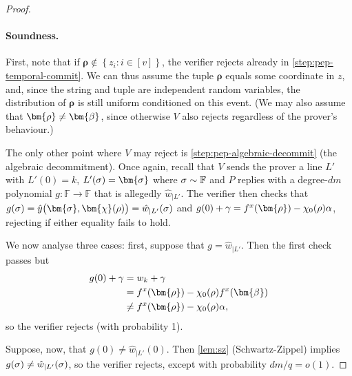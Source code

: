 \documentclass[a4paper,UKenglish,cleveref, autoref, thm-restate]{lipics-v2021}
\theoremstyle{definition}
\newcommand{\field}{\mathbb{F}}
\renewcommand{\set}[1]{\left\{#1\right\}}
\newcommand{\vcommitlength}{v}
\newcommand{\vcommitstring}{z}
\newcommand{\pcommitstring}{y}
\newcommand{\dimension}{m}
\newcommand{\degree}{d}
\newcommand{\fieldsize}{q}
\newcommand{\evaluationpoint}{\bm{\fe2}}
\newcommand{\fingerprinttuple}{\bm{\rho}}
\newcommand{\Fingerprinttuple}{\bm{\sigma}}
\renewcommand{\line}{L}
\def\fe#1{
    \ifnum#1=1
        \alpha
    \else
    \ifnum#1=2
        \beta
    \else
    \ifnum#1=3
        \gamma
    \fi\fi\fi
}
\def\rfe#1{
    \ifnum#1=1
        \rho
    \else
    \ifnum#1=2
        \sigma
    \else
    \fi\fi
}
\begin{document}
\begin{proof}
    \paragraph*{Soundness\iflipics\else.\fi} First, note that if $\fingerprinttuple \notin \set{\vcommitstring_i : i \in [\vcommitlength]}$, the verifier rejects already in \cref{step:pep-temporal-commit}. We can thus assume the tuple $\fingerprinttuple$ equals some coordinate in $\vcommitstring$, and, since the string and tuple are independent random variables, the distribution of $\fingerprinttuple$ is still uniform conditioned on this event. (We may also assume that $\fingerprinttuple \neq \evaluationpoint$, since otherwise $V$ also rejects regardless of the prover's behaviour.)

    The only other point where $V$ may reject is \cref{step:pep-algebraic-decommit} (the algebraic decommitment). Once again, recall that $V$ sends the prover a line $\line'$ with $\line'(0) = k$, $\line'(\rfe2) = \Fingerprinttuple$ where $\rfe2 \sim \field$ and $P$ replies with a degree-$\degree\dimension$ polynomial $g: \field \to \field$ that is allegedly $\hat w_{|\line'}$. The verifier then checks that $g(\rfe2) = \hat \pcommitstring\big(\Fingerprinttuple, \bm{\chi}(\rfe1)\big) = \hat w_{|\line'}(\rfe2)$ and $g(0) + \fe3 = f^x(\fingerprinttuple) - \chi_0(\rfe1) \fe1$, rejecting if either equality fails to hold.
    
    We now analyse three cases: first, suppose that $g = \hat w_{|\line'}$. Then the first check passes but
   \begin{align*}
        g(0) + \fe3 &= w_k + \fe3\\
        &= f^x(\fingerprinttuple) - \chi_0(\rfe1) f^x(\evaluationpoint)\\
        &\neq f^x(\fingerprinttuple) - \chi_0(\rfe1) \fe1,
   \end{align*}
   so the verifier rejects (with probability 1).

    Suppose, now, that $g(0) \neq \hat w_{|\line'}(0)$. Then \cref{lem:sz} (Schwartz-Zippel) implies $g(\rfe2) \neq \hat w_{|\line'}(\rfe2)$, so the verifier rejects, except with probability $\degree\dimension/\fieldsize = o(1)$.
    

\end{proof}
\end{document}
